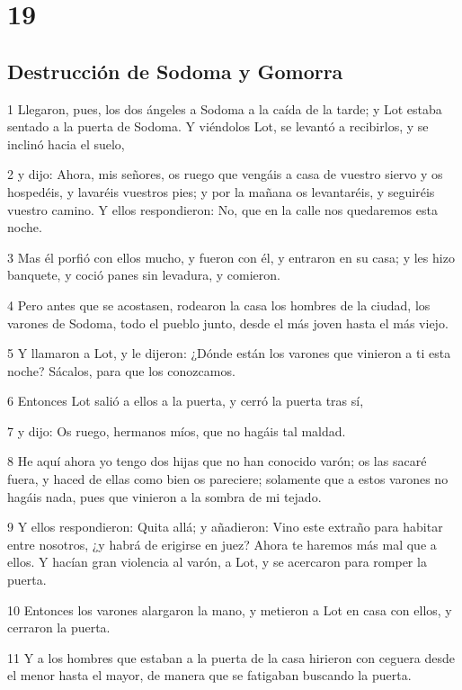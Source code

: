 \chapter{19}

\section*{Destrucción de Sodoma y Gomorra}

\par 1 Llegaron, pues, los dos ángeles a Sodoma a la caída de la tarde; y Lot estaba sentado a la puerta de Sodoma. Y viéndolos Lot, se levantó a recibirlos, y se inclinó hacia el suelo,
\par 2 y dijo: Ahora, mis señores, os ruego que vengáis a casa de vuestro siervo y os hospedéis, y lavaréis vuestros pies; y por la mañana os levantaréis, y seguiréis vuestro camino. Y ellos respondieron: No, que en la calle nos quedaremos esta noche.
\par 3 Mas él porfió con ellos mucho, y fueron con él, y entraron en su casa; y les hizo banquete, y coció panes sin levadura, y comieron.
\par 4 Pero antes que se acostasen, rodearon la casa los hombres de la ciudad, los varones de Sodoma, todo el pueblo junto, desde el más joven hasta el más viejo.
\par 5 Y llamaron a Lot, y le dijeron: ¿Dónde están los varones que vinieron a ti esta noche? Sácalos, para que los conozcamos.
\par 6 Entonces Lot salió a ellos a la puerta, y cerró la puerta tras sí,
\par 7 y dijo: Os ruego, hermanos míos, que no hagáis tal maldad.
\par 8 He aquí ahora yo tengo dos hijas que no han conocido varón; os las sacaré fuera, y haced de ellas como bien os pareciere; solamente que a estos varones no hagáis nada, pues que vinieron a la sombra de mi tejado.
\par 9 Y ellos respondieron: Quita allá; y añadieron: Vino este extraño para habitar entre nosotros, ¿y habrá de erigirse en juez? Ahora te haremos más mal que a ellos. Y hacían gran violencia al varón, a Lot, y se acercaron para romper la puerta.
\par 10 Entonces los varones alargaron la mano, y metieron a Lot en casa con ellos, y cerraron la puerta.
\par 11 Y a los hombres que estaban a la puerta de la casa hirieron con ceguera desde el menor hasta el mayor, de manera que se fatigaban buscando la puerta.
